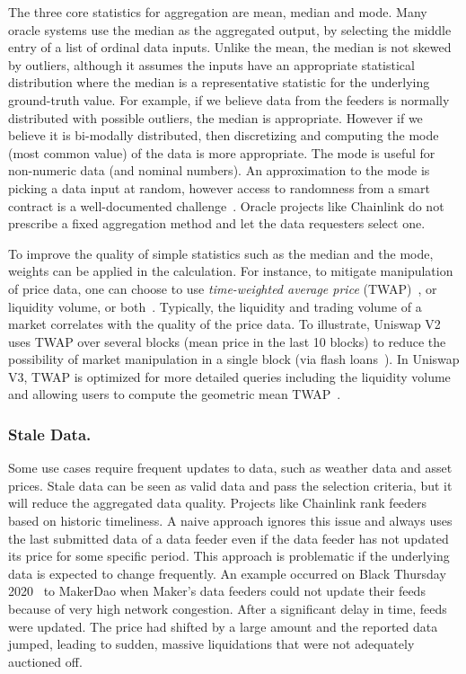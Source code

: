The three core statistics for aggregation are mean, median and mode. Many oracle systems use the median as the aggregated output, by selecting the middle entry of a list of ordinal data inputs. Unlike the mean, the median is not skewed by  outliers, although it assumes the inputs have an appropriate statistical distribution where the median is a representative statistic for the underlying ground-truth value. For example, if we believe data from the feeders is normally distributed with possible outliers, the median is appropriate. However if we believe it is bi-modally distributed, then discretizing and computing the mode (most common value) of the data is more appropriate. The mode is useful for non-numeric data (and nominal numbers). An approximation to the mode is picking a data input at random, however access to randomness from a smart contract is a well-documented challenge~\cite{chatterjee2019probabilistic,bunz2017proofs,chainlinkvrf}. Oracle projects like Chainlink do not prescribe a fixed aggregation method and let the data requesters select one.

To improve the quality of simple statistics such as the median and the mode, weights can be applied in the calculation. For instance, to mitigate manipulation of price data, one can choose to use \textit{time-weighted average price} (TWAP)~\cite{uniswaporacle}, or liquidity volume, or both~\cite{adams2021uniswap}. Typically, the liquidity and trading volume of a market correlates with the quality of the price data. To illustrate, Uniswap V2 uses TWAP over several blocks (\eg mean price in the last 10 blocks) to reduce the possibility of market manipulation in a single block (\eg via flash loans~\cite{qin2020attacking}). In Uniswap V3, TWAP is optimized for more detailed queries including the liquidity volume and allowing users to compute the geometric mean TWAP~\cite{adams2021uniswap}.

\subsubsection{Stale Data.}

Some use cases require frequent updates to data, such as weather data and asset prices. Stale data can be seen as valid data and pass the selection criteria, but it will reduce the aggregated data quality. Projects like Chainlink rank feeders based on historic timeliness. A naive approach ignores this issue and always uses the last submitted data of a data feeder even if the data feeder has not updated its price for some specific period. This approach is problematic if the underlying data is expected to change frequently. An example occurred on Black Thursday 2020~\cite{blackthursdayMaker} to MakerDao when Maker's data feeders could not update their feeds because of very high network congestion. After a significant delay in time, feeds were updated. The price had shifted by a large amount and the reported data jumped, leading to sudden, massive liquidations that were not adequately auctioned off. 

